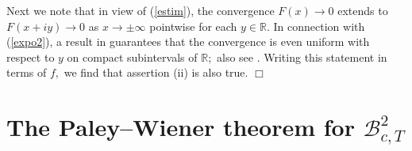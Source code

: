 \documentclass[amsmath,english,a4paper,graphicx,12pt]{article}
\begin{document}
Next we note that in view of (\ref{estim}), the convergence $F(x) \rightarrow 0$ extends to $F(x+iy) \rightarrow 0$ as  $x \rightarrow \pm \infty$ 
pointwise for each $y \in \mathbb{R}.$ In connection with (\ref{expo2}), a result in \cite[Theorem 1.4.9]{BO} guarantees that the convergence 
is even uniform with respect to $y$ on compact subintervals of $\mathbb{R};$ also see \cite[p.~170]{TIT}. Writing this statement in terms of $f,$ we find that assertion (ii) is 
also true. \hfill $\Box$

\section{The Paley--Wiener theorem for $\mathscr{B}^2_{c,T}$}
\end{document}
